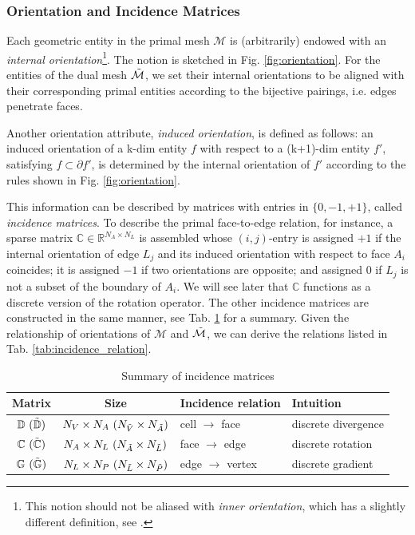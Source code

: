 \documentclass{article}
\begin{document}
\subsubsection{Orientation and Incidence Matrices}
Each geometric entity in the primal mesh $\mathcal{M}$ is (arbitrarily) endowed with an \emph{internal orientation}\footnote{This notion should not be aliased with \emph{inner orientation}, which has a slightly different definition, see \cite[][Sec. 3.1]{tonti_2002}.}. The notion is sketched in Fig. \ref{fig:orientation}. For the entities of the dual mesh $\Tilde{\mathcal{M}}$, we set their internal orientations to be aligned with their corresponding primal entities according to the bijective pairings, i.e. edges penetrate faces.

Another orientation attribute, \emph{induced orientation}, is defined as follows: an induced orientation of a k-dim entity $f$ with respect to a (k+1)-dim entity $f'$, satisfying $f \subset \partial f' $, is determined by the internal orientation of $f'$ according to the rules shown in Fig. \ref{fig:orientation}. 

This information can be described by matrices with entries in $\{0,-1,+1\}$, called \emph{incidence matrices}. To describe the primal face-to-edge relation, for instance, a sparse matrix $\mathbb{C} \in \mathbb{R}^{N_A \times N_L}$ is assembled whose $(i,j)$-entry is assigned $+1$ if the internal orientation of edge $L_j$ and its induced orientation with respect to face $A_i$ coincides; it is assigned $-1$ if two orientations are opposite; and assigned $0$ if $L_j$ is not a subset of the boundary of $A_i$. We will see later that $\mathbb{C}$ functions as a discrete version of the rotation operator. The other incidence matrices are constructed in the same manner, see Tab. \ref{tab:incidence_mat} for a summary. Given the relationship of orientations of $\mathcal{M}$ and $\Tilde{\mathcal{M}}$, we can derive the relations listed in Tab. \ref{tab:incidence_relation}.  

\begin{table}[h!]
    \centering
    \begin{tabular}{c c l l}
    \hline
         Matrix & Size & Incidence relation & Intuition  \\
    \hline
         $\mathbb{D}\ (\Tilde{\mathbb{D}})$ & $N_V \times N_A\ (N_{\Tilde{V}} \times N_{\Tilde{A}})$ & cell $\rightarrow$ face & discrete divergence \\
         $\mathbb{C}\ (\Tilde{\mathbb{C}})$ & $N_A \times N_L\ (N_{\Tilde{A}} \times N_{\Tilde{L}})$ & face $\rightarrow$ edge & discrete rotation \\
         $\mathbb{G}\ (\Tilde{\mathbb{G}})$ & $N_L \times N_P\ (N_{\Tilde{L}} \times N_{\Tilde{P}})$ & edge $\rightarrow$ vertex & discrete gradient
         \\
    \hline
    \end{tabular}
    \caption{Summary of incidence matrices}
    \label{tab:incidence_mat}
\end{table}
\end{document}
